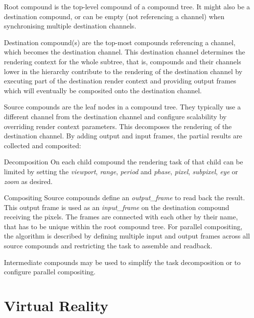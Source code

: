 \begin{compactdesc}
 \item [Root compound] is the top-level compound of a compound tree. It might
 also be a destination compound, or can be empty (not referencing a channel)
 when synchronising multiple destination channels.

\item [Destination compound(s)] are the top-most compounds referencing a
channel, which becomes the destination channel. This destination channel
determines the rendering context for the whole subtree, that is, compounds and
their channels lower in the hierarchy contribute to the rendering of the
destination channel by executing part of the destination render context and
providing output frames which will eventually be composited onto the
destination channel.

 \item [Source compounds] are the leaf nodes in a compound tree. They typically
 use a different channel from the destination channel and configure scalability
 by overriding render context parameters. This decomposes the rendering of the
 destination channel. By adding output and input frames, the partial results are
 collected and composited:
 \begin{compactdesc}
  \item[Decomposition] On each child compound the rendering task of that
  child can be limited by setting the {\em viewport}, {\em range},
  {\em period} and {\em phase}, {\em pixel}, {\em subpixel},
  {\em eye} or {\em zoom} as desired.

  \item[Compositing] Source compounds define an {\em output\_frame} to read
  back the result. This output frame is used as an {\em input\_frame} on the
  destination compound receiving the pixels. The frames are connected with each
  other by their name, that has to be unique within the root compound tree.
  For parallel compositing, the algorithm is described by defining multiple
  input and output frames across all source compounds and restricting the task
  to assemble and readback.

 \end{compactdesc}
 \item[Intermediate compounds] may be used to simplify the task decomposition or
 to configure parallel compositing.
\end{compactdesc}

\section{Virtual Reality}

